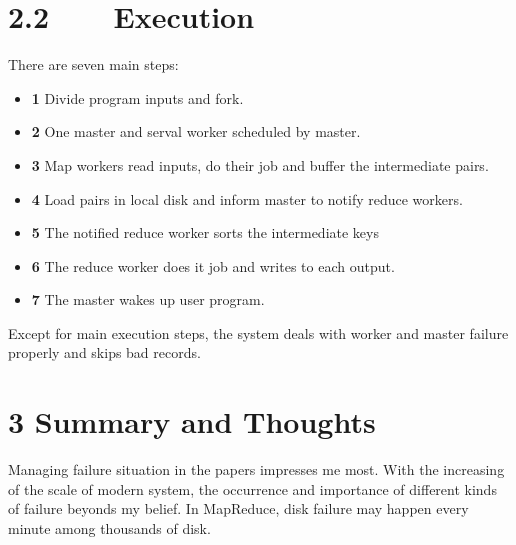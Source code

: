 \documentclass[a4paper]{article}
\begin{document}
 \section*{2.2~~~~Execution}
 There are seven main steps:
 \begin{itemize}
 \item \textbf{1} Divide program inputs and fork.
 \item \textbf{2} One master and serval worker scheduled by master.
 \item \textbf{3} Map workers read inputs, do their job and  buffer the intermediate pairs.
 \item \textbf{4} Load pairs in local disk and inform master to notify reduce workers.
 \item \textbf{5} The notified reduce worker sorts the intermediate keys
 \item \textbf{6} The reduce worker does it job and writes to each output.
 \item \textbf{7} The master wakes up user program.
 \end{itemize}
 Except for main execution steps, the system deals with worker and master failure properly and skips bad records.
 \section*{3 Summary and Thoughts}
 Managing failure situation in the papers impresses me most. With the increasing of  the scale of modern system, the occurrence and importance of different kinds of failure beyonds my belief. In MapReduce, disk failure may happen every minute among thousands of disk. \\[1em]
\end{document}
